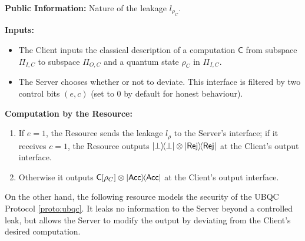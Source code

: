 \documentclass[12pt]{iopart}
\newcommand{\cptp}[1]{\mathsf{#1}} \newcommand{\pd}[1]{\mathcal{#1}}  \newcommand{\sch}[1]{\bm{#1}}
\renewcommand{\1}{\mathds{1}}
\newcommand{\acc}{\mathsf{Acc}}
\newcommand{\rej}{\mathsf{Rej}}
\begin{document}
\begin{resource}[ht]
\caption{Secure Delegated Quantum Computation}
\label{def:bvqc_if}
\begin{algorithmic}[0]

\STATE \textbf{Public Information:} Nature of the leakage $l_{\rho_C}$.

\STATE \textbf{Inputs:} 
\begin{itemize}
\item The Client inputs the classical description of a computation $\cptp C$ from subspace $\Pi_{I,C}$ to subspace $\Pi_{O,C}$ and a quantum state $\rho_C$ in $\Pi_{I,C}$.
\item The Server chooses whether or not to deviate. This interface is filtered by two control bits $(e, c)$ (set to $0$ by default for honest behaviour).
\end{itemize}

\STATE \textbf{Computation by the Resource:}
\begin{enumerate}
\item If $e = 1$, the Resource sends the leakage $l_{\rho}$ to the Server's interface; if it receives $c = 1$, the Resource outputs $\dyad{\bot}\otimes\dyad{\rej}$ at the Client's output interface.
\item Otherwise it outputs $\cptp{C}[\rho_C] \otimes \dyad{\acc}$ at the Client's output interface.
\end{enumerate}

\end{algorithmic}
\end{resource}

On the other hand, the following resource models the security of the UBQC Protocol \ref{proto:ubqc}. It leaks no information to the Server beyond a controlled leak, but allows the Server to modify the output by deviating from the Client's desired computation.
\end{document}
